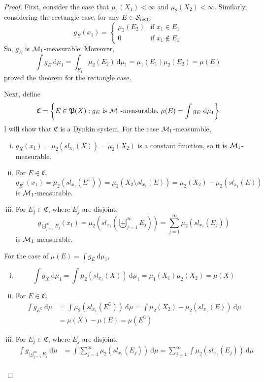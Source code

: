 \begin{proof}
  First, consider the case that $\mu_1(X_1) < \infty$ and $\mu_2(X_2) < \infty$. 
  Similarly, considering the rectangle case, for any $E \in \mathcal S_{\text{rect}}$, 
  \[g_E(x_1) = \begin{cases}
    \mu_2(E_2) & \text{if } x_1 \in E_1 \\
    0 & \text{if } x_1 \notin E_1
  \end{cases}\]
  So, $g_E$ is $\mathcal M_1$-measurable.
  Moreover, 
  \[\int g_E \ \mathrm{d}\mu_1 = \int_{E_1}\mu_2(E_2) \ \mathrm{d}\mu_1 = \mu_1(E_1)\mu_2(E_2) = \mu(E)\]
  proved the theorem for the rectangle case.

  Next, define 
  \[\mathfrak{C} = \left\{E \in \kP(X) : g_E \text{ is }\SM_1\text{-measurable, } \mu(E) = \int g_E \ \mathrm{d}\mu_1\right\}\]
  I will show that $\mathfrak{C}$ is a Dynkin system.
  For the case $\mathcal M_1$-measurable,
  \begin{enumerate}[(i)]
    \item $g_X(x_1) = \mu_2(sl_{x_1}(X)) = \mu_2(X_2)$ is a constant function, so it is $\mathcal M_1$-measurable.
    \item For $E \in \mathfrak{C}$, $g_{E^\complement}(x_1) = \mu_2(sl_{x_1}(E^\complement)) = \mu_2(X_2 \setminus sl_{x_1}(E)) = \mu_2(X_2) - \mu_2(sl_{x_1}(E))$ is $\mathcal M_1$-measurable.
    \item For $E_j \in \mathfrak{C}$, where $E_j$ are disjoint, 
    \[g_{\biguplus_{j=1}^\infty E_j}(x_1) = \mu_2\left(sl_{x_1}\left(\biguplus_{j=1}^\infty E_j\right)\right) = \sum_{j=1}^\infty \mu_2(sl_{x_1}(E_j))\]
     is $\mathcal M_1$-measurable.
  \end{enumerate}
  For the case of $\mu(E) = \int g_E \ \mathrm{d}\mu_1$,
  \begin{enumerate}[(i)]
    \item $$\int g_X \ \mathrm{d}\mu_1 = \int \mu_2(sl_{x_1}(X)) \ \mathrm{d}\mu_1 = \mu_1(X_1)\mu_2(X_2)= \mu(X)$$
    \item For $E \in \mathfrak{C}$,
    \begin{align*}
      \int g_{E^\complement} \ \mathrm{d}\mu &= \int \mu_2(sl_{x_1}(E^\complement)) \ \mathrm{d}\mu = \int \mu_2(X_2) - \mu_2(sl_{x_1}(E)) \ \mathrm{d}\mu \\
      &= \mu(X) - \mu(E) = \mu(E^\complement)
    \end{align*}
    \item For $E_j \in \mathfrak{C}$, where $E_j$ are disjoint,
    \begin{align*}
      \int g_{\biguplus_{j=1}^\infty E_j} \ \mathrm{d}\mu &= \int \sum_{j=1}^\infty \mu_2(sl_{x_1}(E_j)) \ \mathrm{d}\mu = \sum_{j=1}^\infty \int \mu_2(sl_{x_1}(E_j)) \ \mathrm{d}\mu\\

\end{align*}
\end{enumerate}
\end{proof}
